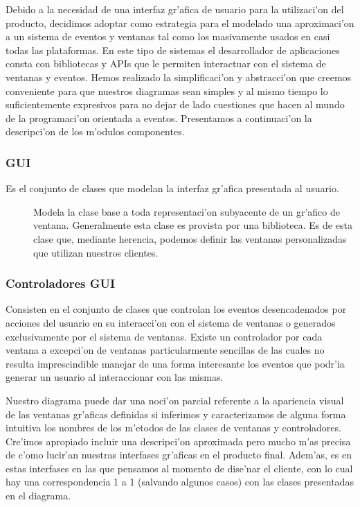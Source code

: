 Debido a la necesidad de una interfaz gr'afica de usuario para la utilizaci'on del producto, decidimos adoptar como estrategia para el modelado una aproximaci'on a un sistema de eventos y ventanas tal como los masivamente usados en casi todas las plataformas. En este tipo de sistemas el desarrollador de aplicaciones consta con bibliotecas y APIs que le permiten interactuar con el sistema de ventanas y eventos. Hemos realizado la simplificaci'on y abstracci'on que creemos conveniente para que nuestros diagramas sean simples y al mismo tiempo lo suficientemente expresivos para no dejar de lado cuestiones que hacen al mundo de la programaci'on orientada a eventos.
Presentamos a continuaci'on la descripci'on de los m'odulos componentes.

\subsubsection{GUI}
Es el conjunto de clases que modelan la interfaz gr'afica presentada al usuario.


\begin{description}
\item[] Modela la clase base a toda representaci'on subyacente de un gr'afico de ventana. Generalmente esta clase es provista por una biblioteca. Es de esta clase que, mediante herencia, podemos definir las ventanas personalizadas que utilizan nuestros clientes.
\end{description}



\subsubsection{Controladores GUI}
Consisten en el conjunto de clases que controlan los eventos desencadenados por acciones del usuario en su interacci'on con el sistema de ventanas o generados exclusivamente por el sistema de ventanas. Existe un controlador por cada ventana a excepci'on de ventanas particularmente sencillas de las cuales no resulta imprescindible manejar de una forma interesante los eventos que podr'ia generar un usuario al interaccionar con las mismas.

Nuestro diagrama puede dar una noci'on parcial referente a la apariencia visual de las ventanas gr'aficas definidas si inferimos y caracterizamos de alguna forma intuitiva los nombres de los m'etodos de las clases de ventanas y controladores. Cre'imos apropiado incluir una descripci'on aproximada pero mucho m'as precisa de c'omo lucir'an nuestras interfases gr'aficas en el producto final. Adem'as, es en estas interfases en las que pensamos al momento de dise'nar el cliente, con lo cual hay una correspondencia 1 a 1 (salvando algunos casos) con las clases presentadas en el diagrama.

